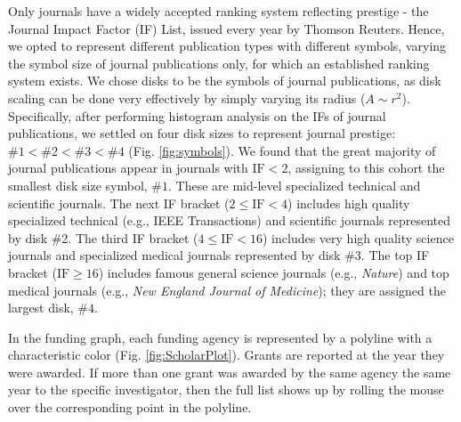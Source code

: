 Only journals have a widely accepted ranking system reflecting prestige - the Journal Impact Factor (IF) List, issued every year by Thomson Reuters. Hence, we opted to represent different publication types with different symbols,  varying the symbol size of  journal publications only, for which an established ranking system exists. We chose disks to be the symbols of journal publications, as disk scaling can be done very effectively by simply varying its radius ($A \sim r^2$). Specifically, after performing histogram analysis on the IFs of journal publications, we settled on four disk sizes to represent journal prestige: $\#1 < \#2 < \#3 < \#4$ (Fig. \ref{fig:symbols}). We found that the great majority of journal publications appear in journals with $\mbox{IF} < 2$, assigning to this cohort the smallest disk size symbol, $\# 1$.  These are mid-level specialized technical and scientific journals. The next IF bracket  ($2 \leq \mbox{IF} < 4$) includes high quality specialized technical (e.g., IEEE Transactions) and scientific journals represented by disk \#2. The third IF bracket ($4 \leq \mbox{IF} < 16$) includes  very high quality science journals and specialized medical journals represented by disk  \#3. The top IF bracket ($\mbox{IF} \geq 16$) includes famous general science journals (e.g., \emph{Nature}) and top medical journals (e.g., \emph{New England Journal of Medicine}); they are assigned the largest disk, $\#4$.

In the funding graph, each funding agency is represented by a polyline with a characteristic color (Fig. \ref{fig:ScholarPlot}). Grants are reported at the year they were awarded. If more than one grant was awarded by the same agency the same year to the specific investigator, then the full list shows up by rolling the mouse over the corresponding point in the polyline.

